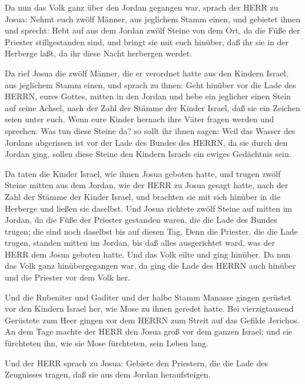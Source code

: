  Da nun das Volk ganz über den Jordan gegangen war, sprach
der HERR zu Josua:  Nehmt euch zwölf Männer, aus jeglichem
Stamm einen,  und gebietet ihnen und sprecht: Hebt auf aus
dem Jordan zwölf Steine von dem Ort, da die Füße der Priester
stillgestanden sind, und bringt sie mit euch hinüber, daß ihr sie in der
Herberge laßt, da ihr diese Nacht herbergen werdet.

 Da rief Josua die zwölf Männer, die er verordnet hatte aus
den Kindern Israel, aus jeglichem Stamm einen,  und sprach
zu ihnen: Geht hinüber vor die Lade des HERRN, eures Gottes, mitten in
den Jordan und hebe ein jeglicher einen Stein auf seine Achsel, nach der
Zahl der Stämme der Kinder Israel,  daß sie ein Zeichen
seien unter euch. Wenn eure Kinder hernach ihre Väter fragen werden und
sprechen: Was tun diese Steine da?  so sollt ihr ihnen
sagen: Weil das Wasser des Jordans abgerissen ist vor der Lade des
Bundes des HERRN, da sie durch den Jordan ging, sollen diese Steine den
Kindern Israels ein ewiges Gedächtnis sein.

 Da taten die Kinder Israel, wie ihnen Josua geboten hatte,
und trugen zwölf Steine mitten aus dem Jordan, wie der HERR zu Josua
gesagt hatte, nach der Zahl der Stämme der Kinder Israel, und brachten
sie mit sich hinüber in die Herberge und ließen sie daselbst.
 Und Josua richtete zwölf Steine auf mitten im Jordan, da
die Füße der Priester gestanden waren, die die Lade des Bundes trugen;
die sind noch daselbst bis auf diesen Tag.  Denn die
Priester, die die Lade trugen, standen mitten im Jordan, bis daß alles
ausgerichtet ward, was der HERR dem Josua geboten hatte. Und das Volk
eilte und ging hinüber.  Da nun das Volk ganz
hinübergegangen war, da ging die Lade des HERRN auch hinüber und die
Priester vor dem Volk her.

 Und die Rubeniter und Gaditer und der halbe Stamm Manasse
gingen gerüstet vor den Kindern Israel her, wie Mose zu ihnen geredet
hatte.  Bei vierzigtausend Gerüstete zum Heer gingen vor
dem HERRN zum Streit auf das Gefilde Jerichos.  An dem Tage
machte der HERR den Josua groß vor dem ganzen Israel; und sie fürchteten
ihn, wie sie Mose fürchteten, sein Leben lang.

 Und der HERR sprach zu Josua:  Gebiete den
Priestern, die die Lade des Zeugnisses tragen, daß sie aus dem Jordan
heraufsteigen.

